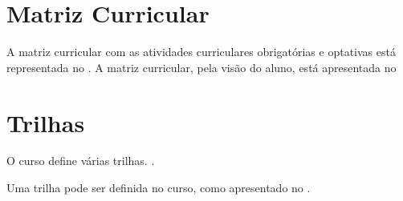 \documentclass[a4]{ppc-ufscar}
\begin{document}
\section{Matriz Curricular}
\ptbrparagrafo[45]

A matriz curricular com as atividades curriculares obrigatórias e optativas está representada no . A matriz curricular, pela visão do aluno, está apresentada no 

\begin{landscape}
    \begin{quadro}
        \caption{Matriz curricular de atividades curriculares do .}
        \label{quadro:matriz-completa}
        \begin{center}
            \PPCMatrizCurricular
        \end{center}
    \end{quadro}
\end{landscape}

\begin{quadro}
    \caption{Matriz curricular de atividades curriculares na visão do aluno.}
    \label{quadro:matriz-aluno}
    \begin{center}
    \end{center}
\end{quadro}

\ptbrparagrafo[70]


\section{Trilhas}

O curso define várias trilhas. \ptbrparagrafo[70].

Uma trilha pode ser definida no curso, como apresentado no .



\begin{quadro}
    \caption{Trilha especial no curso (com certificação).}
    \label{quadro:trilha}
    \begin{center}
    \end{center}
\end{quadro}
\end{document}
